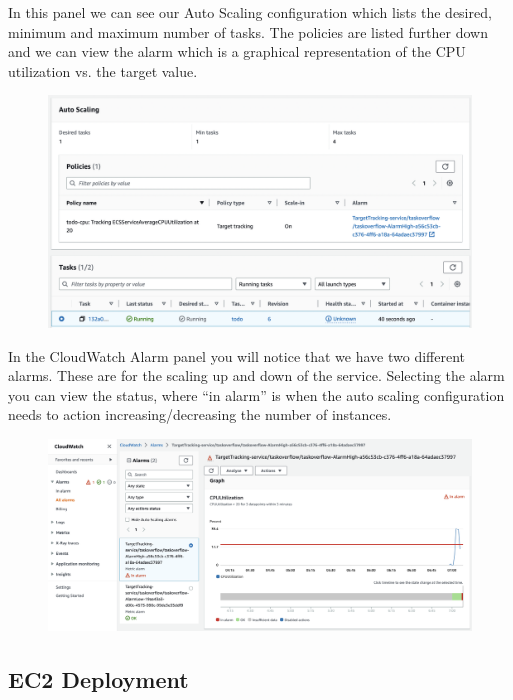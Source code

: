 \documentclass{csse4400}
\begin{document}
In this panel we can see our Auto Scaling configuration which lists the desired, minimum and maximum number of tasks.
The policies are listed further down and we can view the alarm which is a graphical representation of the CPU utilization vs.
the target value.

\begin{figure}[H]
  \begin{center}
    \includegraphics[width=\textwidth]{images/ecs2}
  \end{center}
\end{figure}

In the CloudWatch Alarm panel you will notice that we have two different alarms.
These are for the scaling up and down of the service.
Selecting the alarm you can view the status,
where ``in alarm'' is when the auto scaling configuration needs to action increasing/decreasing the number of instances.

\begin{figure}[H]
  \begin{center}
    \includegraphics[width=\textwidth]{images/ecs3}
  \end{center}
\end{figure}

\subsection{EC2 Deployment}
\end{document}

